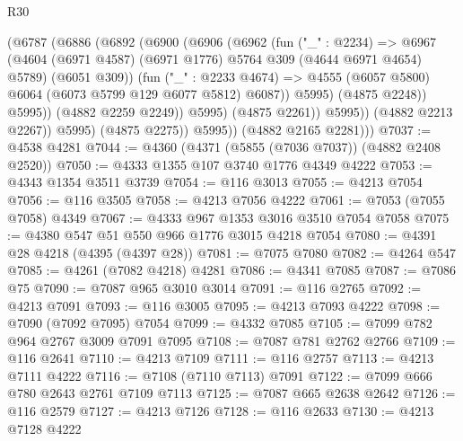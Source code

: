 \begin{lexlean}{R30}
\begin{coremodule}
                          (@6787
                            (@6886
                              (@6892
                                (@6900
                                  (@6906
                                    (@6962
                                      (fun ("_" : @2234) =>
                                      @6967
                                        (@4604
                                          (@6971 @4587)
                                          (@6971 @1776)
                                          @5764
                                          @309
                                          (@4644 @6971 @4654)
                                          @5789)
                                        (@6051 @309))
                                      (fun ("_" : @2233 @4674) =>
                                      @4555
                                        (@6057 @5800)
                                        @6064
                                        (@6073 @5799 @129 @6077 @5812)
                                        @6087))
                                    @5995)
                                  (@4875 @2248))
                                @5995))
                            (@4882 @2259 @2249))
                          @5995)
                        (@4875 @2261))
                      @5995))
                  (@4882 @2213 @2267))
                @5995)
              (@4875 @2275))
            @5995))
        (@4882 @2165 @2281)))
@7037 := @4538 @4281
@7044 := @4360 (@4371 (@5855 (@7036 @7037)) (@4882 @2408 @2520))
@7050 := @4333 @1355 @107 @3740 @1776 @4349 @4222
@7053 := @4343 @1354 @3511 @3739
@7054 := @116 @3013
@7055 := @4213 @7054
@7056 := @116 @3505
@7058 := @4213 @7056 @4222
@7061 := @7053 (@7055 @7058) @4349
@7067 := @4333 @967 @1353 @3016 @3510 @7054 @7058
@7075 := @4380 @547 @51 @550 @966 @1776 @3015 @4218 @7054
@7080 := @4391 @28 @4218 (@4395 (@4397 @28))
@7081 := @7075 @7080
@7082 := @4264 @547
@7085 := @4261 (@7082 @4218) @4281
@7086 := @4341 @7085
@7087 := @7086 @75
@7090 := @7087 @965 @3010 @3014
@7091 := @116 @2765
@7092 := @4213 @7091
@7093 := @116 @3005
@7095 := @4213 @7093 @4222
@7098 := @7090 (@7092 @7095) @7054
@7099 := @4332 @7085
@7105 := @7099 @782 @964 @2767 @3009 @7091 @7095
@7108 := @7087 @781 @2762 @2766
@7109 := @116 @2641
@7110 := @4213 @7109
@7111 := @116 @2757
@7113 := @4213 @7111 @4222
@7116 := @7108 (@7110 @7113) @7091
@7122 := @7099 @666 @780 @2643 @2761 @7109 @7113
@7125 := @7087 @665 @2638 @2642
@7126 := @116 @2579
@7127 := @4213 @7126
@7128 := @116 @2633
@7130 := @4213 @7128 @4222

\end{coremodule}
\end{lexlean}
